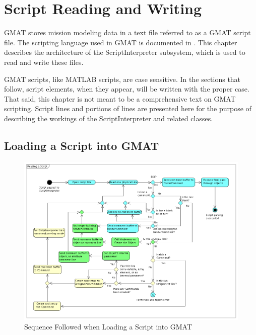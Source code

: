 \chapter{\label{chapter:ScriptRW}Script Reading and Writing}

GMAT stores mission modeling data in a text file referred to as a GMAT script file.  The scripting
language used in GMAT is documented in \cite{userGuide}.  This chapter describes the architecture of
the ScriptInterpreter subsystem, which is used to read and write these files.

GMAT scripts, like MATLAB scripts, are case sensitive.  In the sections that follow, script
elements, when they appear, will be written with the proper case.  That said, this chapter is not
meant to be a comprehensive text on GMAT scripting.  Script lines and portions of lines are
presented here for the purpose of describing the workings of the ScriptInterpreter and related
classes.

\section{\label{section:ReadingScript}Loading a Script into GMAT}

\begin{figure}[htb]
\begin{center}
\includegraphics[430,319]{Images/ReadingaScript.png}
\caption{\label{figure:ReadingScriptFlow}Sequence Followed when Loading a Script into GMAT}
\end{center}
\end{figure}

